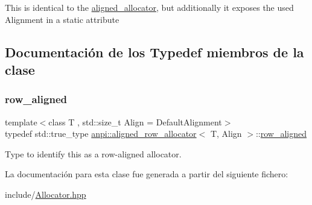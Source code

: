This is identical to the \hyperlink{classanpi_1_1aligned__allocator}{aligned\+\_\+allocator}, but additionally it exposes the used Alignment in a static attribute 

\subsection{Documentación de los \textquotesingle{}Typedef\textquotesingle{} miembros de la clase}
\mbox{\label{classanpi_1_1aligned__row__allocator_a948213c2c7edb9227302f18045428b13}} 
\subsubsection{\texorpdfstring{row\+\_\+aligned}{row\_aligned}}
{\footnotesize\ttfamily template$<$class T , std\+::size\+\_\+t Align = Default\+Alignment$>$ \\
typedef std\+::true\+\_\+type \hyperlink{classanpi_1_1aligned__row__allocator}{anpi\+::aligned\+\_\+row\+\_\+allocator}$<$ T, Align $>$\+::\hyperlink{classanpi_1_1aligned__row__allocator_a948213c2c7edb9227302f18045428b13}{row\+\_\+aligned}}



Type to identify this as a row-\/aligned allocator. 



La documentación para esta clase fue generada a partir del siguiente fichero\+:\begin{DoxyCompactItemize}
\item 
include/\hyperlink{Allocator_8hpp}{Allocator.\+hpp}\end{DoxyCompactItemize}

